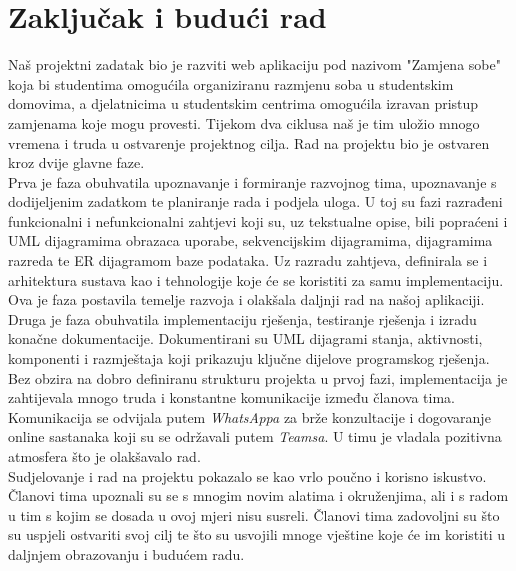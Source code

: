 \chapter{Zaključak i budući rad}
		
		Naš projektni zadatak bio je razviti web aplikaciju pod nazivom "Zamjena sobe" koja bi studentima omogućila organiziranu razmjenu soba u studentskim domovima, a djelatnicima u studentskim centrima omogućila izravan pristup zamjenama koje mogu provesti. Tijekom dva ciklusa naš je tim uložio mnogo vremena i truda u ostvarenje projektnog cilja. Rad na projektu bio je ostvaren kroz dvije glavne faze.
		 \\Prva je faza obuhvatila upoznavanje i formiranje razvojnog tima, upoznavanje s dodijeljenim zadatkom te planiranje rada i podjela uloga. U toj su fazi razrađeni funkcionalni i nefunkcionalni zahtjevi koji su, uz tekstualne opise, bili popraćeni i UML dijagramima obrazaca uporabe, sekvencijskim dijagramima, dijagramima razreda te ER dijagramom baze podataka. Uz razradu zahtjeva, definirala se i arhitektura sustava kao i tehnologije koje će se koristiti za samu implementaciju. Ova je faza postavila temelje razvoja i olakšala daljnji rad na našoj aplikaciji.
		 \\Druga je faza obuhvatila implementaciju rješenja, testiranje rješenja i izradu konačne dokumentacije. Dokumentirani su UML dijagrami stanja, aktivnosti, komponenti i razmještaja koji prikazuju ključne dijelove programskog rješenja. Bez obzira na dobro definiranu strukturu projekta u prvoj fazi, implementacija je zahtijevala mnogo truda i konstantne komunikacije između članova tima. 
		 \\Komunikacija se odvijala putem \textit{WhatsAppa} za brže konzultacije i dogovaranje online sastanaka koji su se održavali putem \textit{Teamsa}. U timu je vladala pozitivna atmosfera što je olakšavalo rad.
		 \\Sudjelovanje i rad na projektu pokazalo se kao vrlo poučno i korisno iskustvo. Članovi tima upoznali su se s mnogim novim alatima i okruženjima, ali i s radom u tim s kojim se dosada u ovoj mjeri nisu susreli. Članovi tima zadovoljni su što su uspjeli ostvariti svoj cilj te što su usvojili mnoge vještine koje će im koristiti u daljnjem obrazovanju i budućem radu.
		
		\eject 
